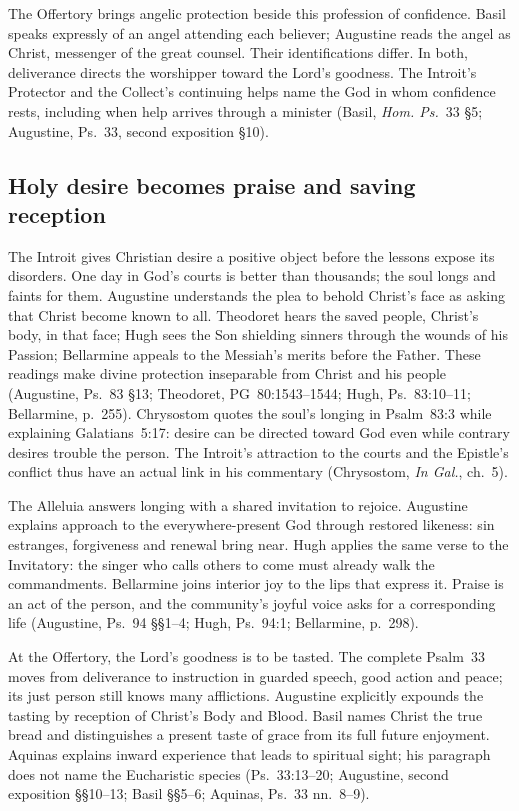 The Offertory brings angelic protection beside this profession of confidence.
Basil speaks expressly of an angel attending each believer; Augustine reads
the angel as Christ, messenger of the great counsel. Their identifications
differ. In both, deliverance directs the worshipper toward the Lord's
goodness. The Introit's Protector and the Collect's continuing helps name the
God in whom confidence rests, including when help arrives through a minister
(Basil, \emph{Hom. Ps.}~33 §5; Augustine, Ps.~33, second exposition §10).

\clearpage
\label{triptych:brief-synthesis:end}

\subsection*{Holy desire becomes praise and saving reception\enspace{}}

The Introit gives Christian desire a positive object before the lessons
expose its disorders. One day in God's courts is better than thousands; the
soul longs and faints for them. Augustine understands the plea to behold
Christ's face as asking that Christ become known to all. Theodoret hears the
saved people, Christ's body, in that face; Hugh sees the Son shielding sinners
through the wounds of his Passion; Bellarmine appeals to the Messiah's
merits before the Father. These readings make divine protection inseparable
from Christ and his people (Augustine, Ps.~83 §13; Theodoret,
PG~80:1543--1544; Hugh, Ps.~83:10--11; Bellarmine, p.~255).
Chrysostom quotes the soul's longing in Psalm~83:3 while explaining
Galatians~5:17: desire can be directed toward God even while contrary
desires trouble the person. The Introit's attraction to the courts and
the Epistle's conflict thus have an actual link in his commentary
(Chrysostom, \emph{In Gal.}, ch.~5).

The Alleluia answers longing with a shared invitation to rejoice. Augustine
explains approach to the everywhere-present God through restored likeness:
sin estranges, forgiveness and renewal bring near. Hugh applies the same
verse to the Invitatory: the singer who calls others to come must already
walk the commandments. Bellarmine joins interior joy to the lips that express
it. Praise is an act of the person, and the community's joyful voice asks for
a corresponding life (Augustine, Ps.~94 §§1--4; Hugh, Ps.~94:1;
Bellarmine, p.~298).

At the Offertory, the Lord's goodness is to be tasted. The complete Psalm~33
moves from deliverance to instruction in guarded speech, good action and
peace; its just person still knows many afflictions. Augustine explicitly
expounds the tasting by reception of Christ's Body and Blood. Basil names
Christ the true bread and distinguishes a present taste of grace from its
full future enjoyment. Aquinas explains inward experience that leads to
spiritual sight; his paragraph does not name the Eucharistic species
(Ps.~33:13--20; Augustine, second exposition §§10--13; Basil §§5--6;
Aquinas, Ps.~33 nn.~8--9).

